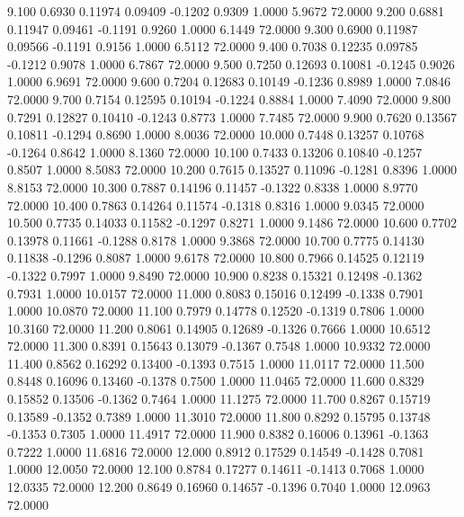    9.100   0.6930   0.11974   0.09409  -0.1202   0.9309   1.0000   5.9672  72.0000
   9.200   0.6881   0.11947   0.09461  -0.1191   0.9260   1.0000   6.1449  72.0000
   9.300   0.6900   0.11987   0.09566  -0.1191   0.9156   1.0000   6.5112  72.0000
   9.400   0.7038   0.12235   0.09785  -0.1212   0.9078   1.0000   6.7867  72.0000
   9.500   0.7250   0.12693   0.10081  -0.1245   0.9026   1.0000   6.9691  72.0000
   9.600   0.7204   0.12683   0.10149  -0.1236   0.8989   1.0000   7.0846  72.0000
   9.700   0.7154   0.12595   0.10194  -0.1224   0.8884   1.0000   7.4090  72.0000
   9.800   0.7291   0.12827   0.10410  -0.1243   0.8773   1.0000   7.7485  72.0000
   9.900   0.7620   0.13567   0.10811  -0.1294   0.8690   1.0000   8.0036  72.0000
  10.000   0.7448   0.13257   0.10768  -0.1264   0.8642   1.0000   8.1360  72.0000
  10.100   0.7433   0.13206   0.10840  -0.1257   0.8507   1.0000   8.5083  72.0000
  10.200   0.7615   0.13527   0.11096  -0.1281   0.8396   1.0000   8.8153  72.0000
  10.300   0.7887   0.14196   0.11457  -0.1322   0.8338   1.0000   8.9770  72.0000
  10.400   0.7863   0.14264   0.11574  -0.1318   0.8316   1.0000   9.0345  72.0000
  10.500   0.7735   0.14033   0.11582  -0.1297   0.8271   1.0000   9.1486  72.0000
  10.600   0.7702   0.13978   0.11661  -0.1288   0.8178   1.0000   9.3868  72.0000
  10.700   0.7775   0.14130   0.11838  -0.1296   0.8087   1.0000   9.6178  72.0000
  10.800   0.7966   0.14525   0.12119  -0.1322   0.7997   1.0000   9.8490  72.0000
  10.900   0.8238   0.15321   0.12498  -0.1362   0.7931   1.0000  10.0157  72.0000
  11.000   0.8083   0.15016   0.12499  -0.1338   0.7901   1.0000  10.0870  72.0000
  11.100   0.7979   0.14778   0.12520  -0.1319   0.7806   1.0000  10.3160  72.0000
  11.200   0.8061   0.14905   0.12689  -0.1326   0.7666   1.0000  10.6512  72.0000
  11.300   0.8391   0.15643   0.13079  -0.1367   0.7548   1.0000  10.9332  72.0000
  11.400   0.8562   0.16292   0.13400  -0.1393   0.7515   1.0000  11.0117  72.0000
  11.500   0.8448   0.16096   0.13460  -0.1378   0.7500   1.0000  11.0465  72.0000
  11.600   0.8329   0.15852   0.13506  -0.1362   0.7464   1.0000  11.1275  72.0000
  11.700   0.8267   0.15719   0.13589  -0.1352   0.7389   1.0000  11.3010  72.0000
  11.800   0.8292   0.15795   0.13748  -0.1353   0.7305   1.0000  11.4917  72.0000
  11.900   0.8382   0.16006   0.13961  -0.1363   0.7222   1.0000  11.6816  72.0000
  12.000   0.8912   0.17529   0.14549  -0.1428   0.7081   1.0000  12.0050  72.0000
  12.100   0.8784   0.17277   0.14611  -0.1413   0.7068   1.0000  12.0335  72.0000
  12.200   0.8649   0.16960   0.14657  -0.1396   0.7040   1.0000  12.0963  72.0000
